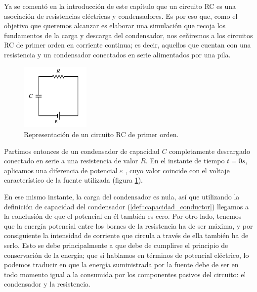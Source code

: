 \documentclass[../main.tex]{subfiles}
\begin{document}
Ya se comentó en la introducción de este capítulo que un circuito RC es una asociación de resistencias eléctricas y condensadores. Es por eso que, como el objetivo que queremos alcanzar es elaborar una simulación que recoja los fundamentos de la carga y descarga del condensador, nos ceñiremos a los circuitos RC de primer orden en corriente continua; es decir, aquellos que cuentan con una resistencia y un condensador conectados en serie alimentados por una pila.\\ 

\begin{figure}[!h]
    \centering
    \includegraphics[width=0.3\textwidth]{images/Circuito_RC.png}
    \caption{Representación de un circuito RC de primer orden.}
    \label{fig::circuito_rc_representación}
\end{figure}

Partimos entonces de un condensador de capacidad $C$ completamente descargado conectado en serie a una resistencia de valor $R$. En el instante de tiempo $t=0s$, aplicamos una diferencia de potencial $\varepsilon$ , cuyo valor coincide con el voltaje característico de la fuente utilizada (figura \ref{fig::circuito_rc_representación}).


En ese mismo instante, la carga del condensador es nula, así que utilizando la definición de capacidad del condensador (\ref{def::capacidad_conductor}) llegamos a la conclusión de que el potencial en él también es cero. Por otro lado, tenemos que la energía potencial entre los bornes de la resistencia ha de ser máxima, y por consiguiente la intensidad de corriente que circula a través de ella también ha de serlo. Esto se debe principalmente a que debe de cumplirse el principio de conservación de la energía; que si hablamos en términos de potencial eléctrico, lo podemos traducir en que la energía suministrada por la fuente debe de ser en todo momento igual a la consumida por los componentes pasivos del circuito: el condensador y la resistencia.
\end{document}

